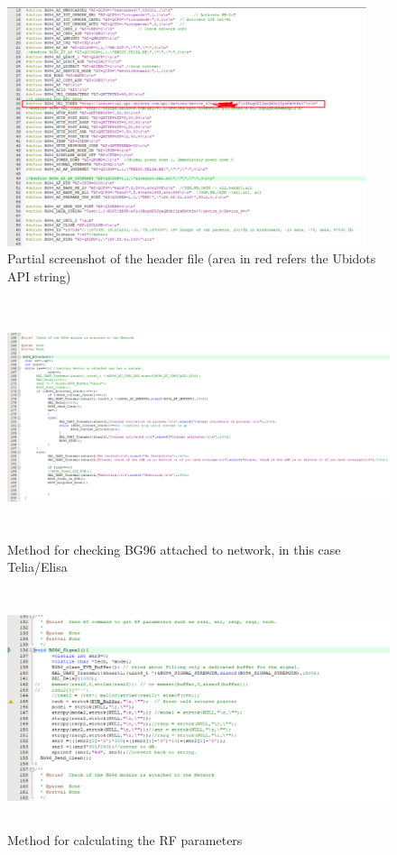 \documentclass[12pt]{article}
\begin{document}
\begin{figure}[H]
    \centering
    \includegraphics[width=\columnwidth,height=7cm,keepaspectratio]{Images/uvision/headerFile.pdf}
    \caption{Partial screenshot of the header file (area in red refers the Ubidots API string) }
 
\end{figure}

\begin{figure}[H]
    \centering
    \includegraphics[width=\columnwidth,height=7cm,keepaspectratio]{Images/uvision/BG96_attached.pdf}
    \caption{Method for checking BG96 attached to network, in this case Telia/Elisa }
    
\end{figure}

\begin{figure}[H]
    \centering
    \includegraphics[width=\columnwidth,height=7cm,keepaspectratio]{Images/uvision/BG96_signal.pdf}
    \caption{Method for calculating the RF parameters}
    
\end{figure}
\end{document}
